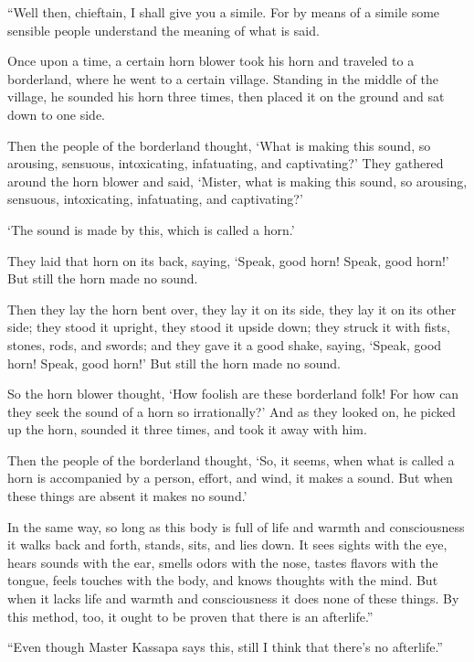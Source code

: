 \documentclass[12pt,openany]{book}%
\begin{document}
“Well then, chieftain, I shall give you a simile. For by means of a simile some sensible people understand the meaning of what is said. 

Once upon a time, a certain horn blower took his horn and traveled to a borderland, where he went to a certain village. Standing in the middle of the village, he sounded his horn three times, then placed it on the ground and sat down to one side. 

Then the people of the borderland thought, ‘What is making this sound, so arousing, sensuous, intoxicating, infatuating, and captivating?’ They gathered around the horn blower and said, ‘Mister, what is making this sound, so arousing, sensuous, intoxicating, infatuating, and captivating?’ 

‘The sound is made by this, which is called a horn.’ 

They laid that horn on its back, saying, ‘Speak, good horn! Speak, good horn!’ But still the horn made no sound. 

Then they lay the horn bent over, they lay it on its side, they lay it on its other side; they stood it upright, they stood it upside down; they struck it with fists, stones, rods, and swords; and they gave it a good shake, saying, ‘Speak, good horn! Speak, good horn!’ But still the horn made no sound. 

So the horn blower thought, ‘How foolish are these borderland folk! For how can they seek the sound of a horn so irrationally?’ And as they looked on, he picked up the horn, sounded it three times, and took it away with him. 

Then the people of the borderland thought, ‘So, it seems, when what is called a horn is accompanied by a person, effort, and wind, it makes a sound. But when these things are absent it makes no sound.’ 

In the same way, so long as this body is full of life and warmth and consciousness it walks back and forth, stands, sits, and lies down. It sees sights with the eye, hears sounds with the ear, smells odors with the nose, tastes flavors with the tongue, feels touches with the body, and knows thoughts with the mind. But when it lacks life and warmth and consciousness it does none of these things. By this method, too, it ought to be proven that there is an afterlife.” 

“Even though Master Kassapa says this, still I think that there’s no afterlife.” 
\end{document}
